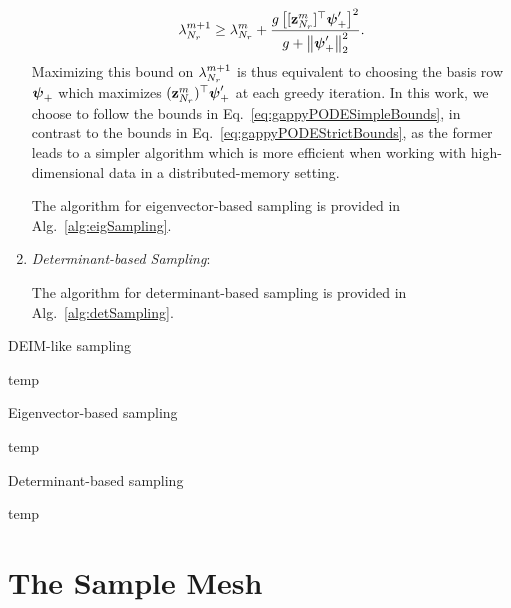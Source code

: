 \begin{enumerate}
	\begin{equation}\label{eq:gappyPODESimpleBounds}
		\lambda_{N_r}^{m+1} \ge \lambda_{N_r}^{m} + \frac{g \left[ [\mathbf{z}_{N_r}^{m}]^\top \boldsymbol{\psi}'_+ \right]^2}{g + \left\Vert \boldsymbol{\psi}'_+ \right\Vert_2^2}.
	\end{equation}
	Maximizing this bound on $\lambda_{N_r}^{m+1}$ is thus equivalent to choosing the basis row $\boldsymbol{\psi}_+$ which maximizes $(\mathbf{z}_{N_r}^{m})^\top \boldsymbol{\psi}'_+$ at each greedy iteration. In this work, we choose to follow the bounds in Eq.~\ref{eq:gappyPODESimpleBounds}, in contrast to the bounds in Eq.~\ref{eq:gappyPODEStrictBounds}, as the former leads to a simpler algorithm which is more efficient when working with high-dimensional data in a distributed-memory setting.

	The algorithm for eigenvector-based sampling is provided in Alg.~\ref{alg:eigSampling}.

	\item \textit{Determinant-based Sampling}:

	The algorithm for determinant-based sampling is provided in Alg.~\ref{alg:detSampling}.

\end{enumerate}

\begin{algorithm}
	\caption{DEIM-like sampling}\label{alg:deimSampling}
	\begin{algorithmic}
		\STATE temp
	\end{algorithmic}
\end{algorithm}

\begin{algorithm}
    \caption{Eigenvector-based sampling}\label{alg:eigSampling}
    \begin{algorithmic}
		\STATE temp
    \end{algorithmic}
\end{algorithm}

\begin{algorithm}
    \caption{Determinant-based sampling}\label{alg:detSampling}
    \begin{algorithmic}
		\STATE temp
    \end{algorithmic}
\end{algorithm}

\section{The Sample Mesh}\label{sec:sampleMesh}

